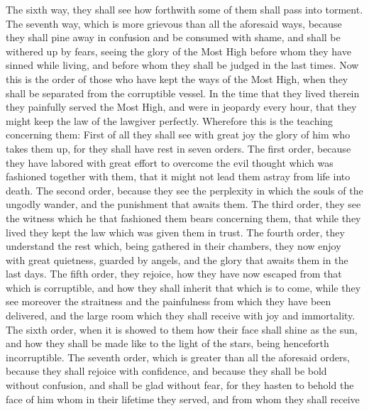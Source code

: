 {The sixth way, they shall see
 how forthwith some of them shall pass into torment.
The seventh way, which is
 more grievous than all the aforesaid ways, because they shall pine away in confusion and be consumed with
 shame, and shall be withered up by fears, seeing the glory of the Most High before whom they have sinned while living, and before whom they shall be judged in the last times.
Now this is the order of those who have kept the ways of the Most High, when they shall be separated from the corruptible vessel.
In the time
 that they lived therein they painfully served the Most High, and were in jeopardy every hour, that they might keep the law of the lawgiver perfectly.
Wherefore this is the teaching concerning them:
First of all they shall see with great joy the glory of him who takes them up, for they shall have rest in seven orders.
The first order, because they have labored with great effort to overcome the evil thought which was fashioned together with them, that it might not lead them astray from life into death.
The second order, because they see the perplexity in which the souls of the ungodly wander, and the punishment that awaits them.
The third order, they see the witness which he that fashioned them bears concerning them, that while they lived they kept the law which was given them in trust.
The fourth order, they understand the rest which, being gathered in their chambers, they now enjoy with great quietness, guarded by angels, and the glory that awaits them in the last days.
The fifth order, they rejoice,
{} how they have now escaped from that which is corruptible, and how they shall inherit that which is to come, while they see moreover the straitness and the
 painfulness from which they have been delivered, and the large room which they shall receive with joy and immortality.
The sixth order, when it is showed to them how their face shall shine as the sun, and how they shall be made like to the light of the stars, being henceforth incorruptible.
The seventh order, which is greater than all the aforesaid orders, because they shall rejoice with confidence, and because they shall be bold without confusion, and shall be glad without fear, for they hasten to behold the face of him whom in their lifetime they served, and from whom they shall receive
}

